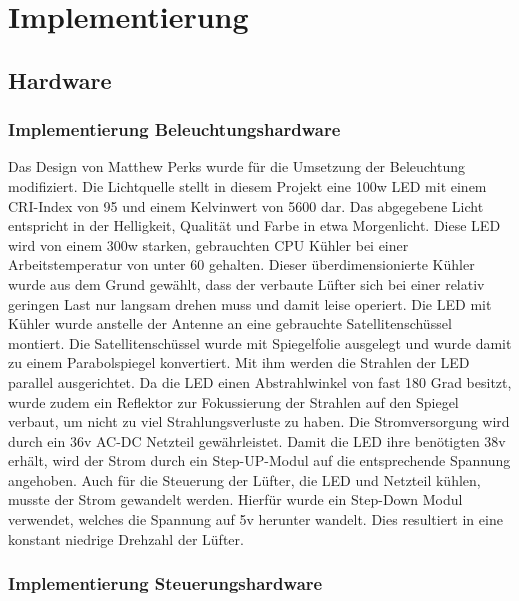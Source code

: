 \chapter{Implementierung}

\section{Hardware}

\subsection{Implementierung Beleuchtungshardware}
Das Design von Matthew Perks wurde für die Umsetzung der Beleuchtung modifiziert. Die Lichtquelle stellt in diesem Projekt eine 100w LED mit einem CRI-Index von 95 und einem Kelvinwert von 5600 dar. Das abgegebene Licht entspricht in der Helligkeit, Qualität und Farbe in etwa Morgenlicht. Diese LED wird von einem 300w starken, gebrauchten CPU Kühler bei einer Arbeitstemperatur von unter 60 gehalten. Dieser überdimensionierte Kühler wurde aus dem Grund gewählt, dass der verbaute Lüfter sich bei einer relativ geringen Last nur langsam drehen muss und damit leise operiert. Die LED mit Kühler wurde anstelle der Antenne an eine gebrauchte Satellitenschüssel montiert. Die Satellitenschüssel wurde mit Spiegelfolie ausgelegt und wurde damit zu einem Parabolspiegel konvertiert. Mit ihm werden die Strahlen der LED parallel ausgerichtet. Da die LED einen Abstrahlwinkel von fast 180 Grad besitzt, wurde zudem ein Reflektor zur Fokussierung der Strahlen auf den Spiegel verbaut, um nicht zu viel Strahlungsverluste zu haben. Die Stromversorgung wird durch ein 36v AC-DC Netzteil gewährleistet. Damit die LED ihre benötigten 38v erhält, wird der Strom durch ein Step-UP-Modul auf die entsprechende Spannung angehoben. Auch für die Steuerung der Lüfter, die LED und Netzteil kühlen, musste der Strom gewandelt werden. Hierfür wurde ein Step-Down Modul verwendet, welches die Spannung auf 5v herunter wandelt. Dies resultiert in eine konstant niedrige Drehzahl der Lüfter.

\subsection{Implementierung Steuerungshardware}

